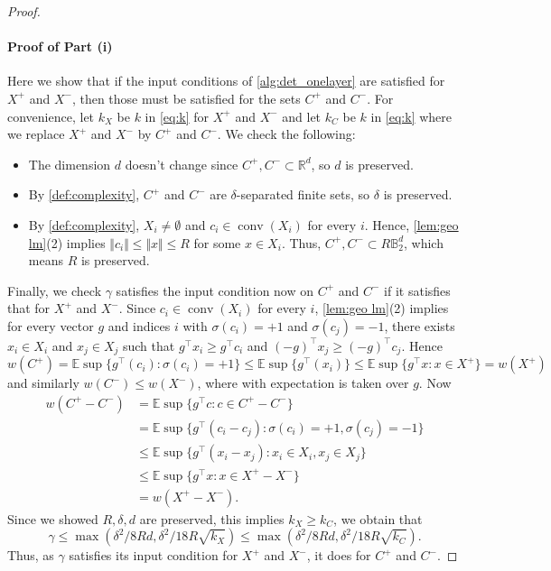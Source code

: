 \documentclass[aoap]{imsart}
\numberwithin{equation}{section}
\theoremstyle{definition}
\theoremstyle{remark}
\newcommand{\R}{\mathbb{R}} %
\numberwithin{equation}{section}
\newcommand{\0}{\mathbf{0}}
\newcommand{\1}{\mathbf{1}}
\newcommand{\E}{\mathbb{E}}
\newcommand{\B}{\mathbb{B}}
\DeclareMathOperator{\conv}{conv}
\numberwithin{equation}{section}
\begin{document}
\begin{proof}
\paragraph{Proof of Part (i)}
Here we show that if the input conditions of \cref{alg:det_onelayer} are satisfied for $X^{+}$ and $X^{-}$, then those must be satisfied for the sets $C^{+}$ and $C^{-}$. For convenience, let $k_X$ be $k$ in \eqref{eq:k} for $X^+$ and $X^-$ and let $k_C$ be $k$ in \eqref{eq:k} where we replace $X^+$ and $X^-$ by $C^+$ and $C^-$. We check the following:
\begin{itemize}
    \item The dimension $d$ doesn't change since $C^+, C^-\subset \R^d$, so $d$ is preserved.
    \item By \cref{def:complexity}, $C^+$ and $C^-$ are $\delta$-separated finite sets, so $\delta$ is preserved.
    \item By \cref{def:complexity}, $X_i\neq\emptyset$ and $c_i\in \conv(X_i)$ for every $i$. Hence, \cref{lem:geo lm}(2) implies $\Vert c_i\Vert \leq \Vert x\Vert \leq R$ for some $x\in X_i$. Thus, $C^+, C^-\subset R\B_2^d$, which means $R$ is preserved.
\end{itemize}
Finally, we check $\gamma$ satisfies the input condition now on $C^+$ and $C^-$ if it satisfies that for $X^+$ and $X^-$. Since $c_i\in \conv(X_i)$ for every $i$, \cref{lem:geo lm}(2) implies for every vector $g$ and indices $i$ with $\sigma(c_i)=+1$ and $\sigma (c_j)=-1$, there exists $x_i\in X_i$ and $x_j\in X_j$ such that $g^{\intercal}x_i\geq g^{\intercal}c_i$ and $(-g)^{\intercal}x_j\geq (-g)^{\intercal}c_j$. Hence
\[     w(C^+)
 = \E  \sup\lbrace g^{\intercal}(c_i) :\sigma(c_i)=+1\rbrace 
\leq \E  \sup\lbrace g^{\intercal}(x_i)\rbrace 
\leq \E  \sup\lbrace g^{\intercal}x : x\in X^+ \rbrace 
= w(X^+)\]
and similarly $w(C^-)\leq w(X^-)$, where with expectation is taken over $g$. Now
\begin{align*}
    w(C^+-C^-) & = \E  \sup \lbrace g^{\intercal}c : {c\in C^+-C^-}\rbrace 
    \\ & = \E  \sup\lbrace g^{\intercal}(c_i-c_j) :\sigma(c_i)=+1, \sigma (c_j)=-1 \rbrace
    \\ & \leq \E  \sup\lbrace g^{\intercal}(x_i-x_j) : x_i \in X_i, x_j \in X_j\rbrace 
    \\ & \leq \E  \sup\lbrace g^{\intercal}x : x\in X^+-X^- \rbrace 
    \\ & = w(X^+-X^-).
\end{align*}
Since we showed $R, \delta, d$ are preserved, this implies $k_X\geq k_C$, we obtain that
\[\gamma \leq \max(\delta^2/8Rd, \delta^2/18R\sqrt{k_X})\leq \max(\delta^2/8Rd, \delta^2/18R\sqrt{k_C}).\]
Thus, as $\gamma$ satisfies its input condition for $X^+$ and $X^-$, it does for $C^+$ and $C^-$.


\end{proof}
\end{document}
